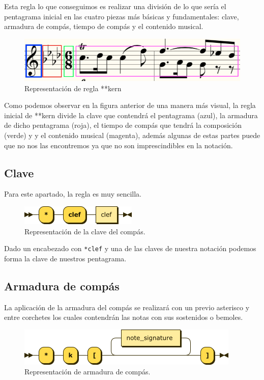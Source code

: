 \documentclass{article}
\begin{document}
    Esta regla lo que conseguimos es realizar una división de lo que sería el pentagrama inicial en las cuatro piezas más
    básicas y fundamentales: clave, armadura de compás, tiempo de compás y el contenido musical.

    \begin{figure}[H]
        \centering
        \includegraphics[scale = 0.5]{imagesMem/pentagrama.png}
        \caption{Representación de regla **kern}
    \end{figure}

    Como podemos observar en la figura anterior de una manera más visual, la regla inicial de **kern divide
    la clave que contendrá el pentagrama (azul), la armadura de dicho pentagrama (roja), el tiempo de compás que tendrá la composición (verde) y
    y el contenido musical (magenta), además algunas de estas partes puede que no nos las encontremos ya que no son imprescindibles
    en la notación.

    \subsection{Clave}
    Para este apartado, la regla es muy sencilla.

    \begin{figure}[H]
        \centering
        \includegraphics[scale = 0.55]{figures_railroad/png/skern/mastercleff.png}
        \caption{Representación de la clave del compás.}
    \end{figure}

    Dado un encabezado con \texttt{*clef} y una de las claves de nuestra notación podemos forma la clave de nuestros pentagrama.

    \subsection{Armadura de compás}
    La aplicación de la armadura del compás se realizará con un previo asterisco y entre corchetes los cuales contendrán
    las notas con sus sostenidos o bemoles.
    \begin{figure}[H]
        \centering
        \includegraphics[scale = 0.55]{figures_railroad/png/skern/keysignature.png}
        \caption{Representación de armadura de compás.}
    \end{figure}
\end{document}
